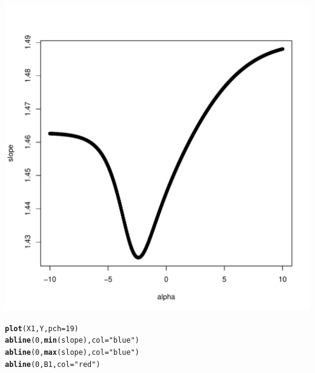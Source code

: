 \documentclass[xcolor=dvipsnames]{beamer}\usepackage{graphicx, color}
\makeatletter
\def\maxwidth{ %
  \ifdim\Gin@nat@width>\linewidth
    \linewidth
  \else
    \Gin@nat@width
  \fi
}
\newcommand{\hlfunctioncall}[1]{\textcolor[rgb]{0.501960784313725,0,0.329411764705882}{\textbf{#1}}}%
\newcommand{\hlstring}[1]{\textcolor[rgb]{0.6,0.6,1}{#1}}%
\newenvironment{kframe}{%
 \def\at@end@of@kframe{}%
 \ifinner\ifhmode%
  \def\at@end@of@kframe{\end{minipage}}%
  \begin{minipage}{\columnwidth}%
 \fi\fi%
 \def\FrameCommand##1{\hskip\@totalleftmargin \hskip-\fboxsep
 \colorbox{shadecolor}{##1}\hskip-\fboxsep
     \hskip-\linewidth \hskip-\@totalleftmargin \hskip\columnwidth}%
 \MakeFramed {\advance\hsize-\width
   \@totalleftmargin\z@ \linewidth\hsize
   \@setminipage}}%
 {\par\unskip\endMakeFramed%
 \at@end@of@kframe}
\newenvironment{knitrout}{}{} %
\makeatother
\begin{document}
\begin{frame}[fragile]
\begin{knitrout}
\color{fgcolor}
\includegraphics[width=\maxwidth]{figure/unnamed-chunk-6} 

\end{knitrout}

\end{frame}

\begin{frame}[fragile]
\begin{knitrout}
\color{fgcolor}\begin{kframe}
\begin{alltt}
\hlfunctioncall{plot}(X1, Y, pch = 19)
\hlfunctioncall{abline}(0, \hlfunctioncall{min}(slope), col = \hlstring{"blue"})
\hlfunctioncall{abline}(0, \hlfunctioncall{max}(slope), col = \hlstring{"blue"})
\hlfunctioncall{abline}(0, B1, col = \hlstring{"red"})
\end{alltt}
\end{kframe}
\end{knitrout}

\end{frame}
\end{document}
